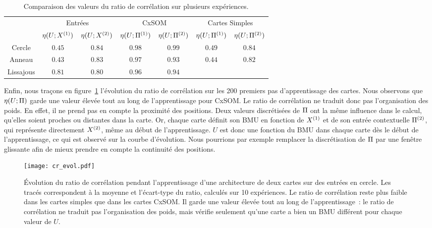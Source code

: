 \documentclass[../main]{subfiles}
\begin{document}
\begin{table}
    \centering
    \caption{Comparaison des valeurs du ratio de corrélation sur plusieurs expériences.\label{tab:eta}}
    \begin{tabular}{*7c}
        \toprule
        & \multicolumn{2}{c}{Entrées} & \multicolumn{2}{c}{CxSOM} & \multicolumn{2}{c}{Cartes Simples} \\
        \cmidrule(lr){2-7}
         & $\eta(U;X^{({1})})$ & $\eta(U;X^{({2})})$  & $\eta(U;\Pi^{({1})})$ & $\eta(U;\Pi^{({2})})$  & $\eta(U;\Pi^{({1})})$ & $\eta(U;\Pi^{({2})})$ \\    
        \midrule
        Cercle &   $0.45 $    & $0.84$  &  $0.98$ & $0.99$ & $0.49$ & $0.84$      \\
        Anneau &  $0.43$      &  $0.83$      & $0.97$ & $0.93$ & $0.44$ & $0.82$ \\
        Lissajous &  $0.81$     &  $0.80$ & $0.96$ & $0.94$  & & \\
        \bottomrule
    \end{tabular}
\end{table}

Enfin, nous traçons en figure~\ref{fig:cr_evol} l'évolution du ratio de corrélation sur les 200 premiers pas d'apprentissage des cartes. 
Nous observons que $\eta(U;\Pi)$ garde une valeur élevée tout au long de l'apprentissage pour CxSOM.
Le ratio de corrélation ne traduit donc pas l'organisation des poids.
En effet, il ne prend pas en compte la proximité des positions. Deux valeurs discrétisées de $\Pi$ ont la même influence dans le calcul, qu'elles soient proches ou distantes dans la carte.
Or, chaque carte définit son BMU en fonction de $X^{({1})}$ et de son entrée contextuelle $\Pi^{({2})}$, qui représente directement $X^{({2})}$, même au début de l'apprentissage. $U$ est donc une fonction du BMU dans chaque carte dès le début de l'apprentissage, ce qui est observé sur la courbe d'évolution.
Nous pourrions par exemple remplacer la discrétisation de $\Pi$ par une fenêtre glissante afin de mieux prendre en compte la continuité des positions.

\begin{figure}
    \texttt{[image: cr\_evol.pdf]}
    \caption{\'Evolution du ratio de corrélation pendant l'apprentissage d'une architecture de deux cartes sur des entrées en cercle. Les tracés correspondent à la moyenne et l'écart-type du ratio, calculés sur 10 expériences. Le ratio de corrélation reste plus faible dans les cartes simples que dans les cartes CxSOM. Il garde une valeur élevée tout au long de l'apprentissage~: le ratio de corrélation ne traduit pas l'organisation des poids, mais vérifie seulement qu'une carte a bien un BMU différent pour chaque valeur de $U$. \label{fig:cr_evol}}
\end{figure}
\end{document}
